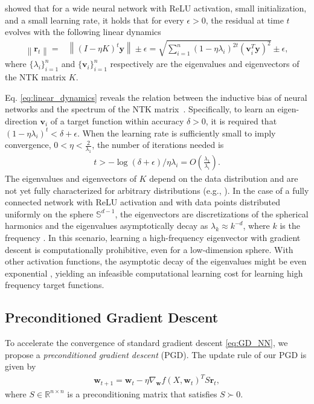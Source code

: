 \documentclass[10pt]{article} %
\theoremstyle{plain}
\theoremstyle{definition}
\theoremstyle{remark}
\newcommand{\Real}{\mathbb{R}}
\newcommand{\norm}[1]{\left\lVert#1\right\rVert}
\newcommand{\vv}{\mathbf{v}}
\newcommand{\y}{\mathbf{y}}
\newcommand{\res}{\mathbf{r}}
\newcommand{\w}{\mathbf{w}}
\begin{document}
\cite{arora2019fine} showed that for a wide neural network with ReLU activation, small initialization, and a small learning rate, it holds that for every $\epsilon>0$, the residual at time $t$ evolves with the following linear dynamics 
\begin{align}\label{eq:linear_dynamics}
    \norm{\res_t}
    =& \norm{(I-\eta K)^t \y} \pm \epsilon
    = \sqrt{\sum_{i=1}^{n}(1-\eta \lambda_i)^{2t}(\vv_i^T\y)^2}\pm \epsilon,
\end{align}
where $\{\lambda_i\}_{i=1}^n$ and $\{\vv_i\}_{i=1}^n$ respectively are the eigenvalues and eigenvectors of the NTK matrix $K$. 

Eq. \eqref{eq:linear_dynamics} reveals the relation between the inductive bias of neural networks and the spectrum of the NTK matrix~\citep{basri2020frequency}. Specifically, to learn an eigen-direction $\vv_i$ of a target function within accuracy $\delta>0$, it is required that $(1-\eta \lambda_i)^t < \delta + \epsilon$. When the learning rate is sufficiently small to imply convergence, $0< \eta < \frac{2}{\lambda_1}$, the number of iterations needed is
\begin{align*}
    t>-\log(\delta+\epsilon)/\eta \lambda_i = O\left(\frac{\lambda_1}{\lambda_i}\right).
\end{align*} 
The eigenvalues and eigenvectors of $K$ depend on the data distribution and are not yet fully characterized for arbitrary distributions (e.g., \cite{basri2020Nonuniform}). In the case of a fully connected network with ReLU activation and with data points distributed uniformly on the sphere $\mathbb{S}^{d-1}$, 
the eigenvectors are discretizations of the spherical harmonics and the eigenvalues asymptotically decay as $\lambda_k\approx k^{-d}$, where $k$ is the frequency \citep{basri2020frequency,bietti2020deep}. In this scenario, learning a high-frequency eigenvector with gradient descent is computationally prohibitive, even for a low-dimension sphere. With other activation functions, the asymptotic decay of the eigenvalues might be even exponential \citep{murray2022characterizing}, yielding an infeasible computational learning cost for learning high frequency target functions. 

\subsection{Preconditioned Gradient Descent} \label{sec:PGD_conv}
To accelerate the convergence of standard gradient descent \eqref{eq:GD_NN}, we propose a \textit{preconditioned gradient descent} (PGD). The update rule of our PGD is given by
\begin{align} \label{eq:PGD}
    \w_{t+1} = \w_{t}-\eta \nabla_\w f(X,\w_t)^TS\res_t,
\end{align}
where $S\in \Real^{n\times n}$ is a preconditioning matrix that satisfies $S\succ 0$. 
\end{document}
